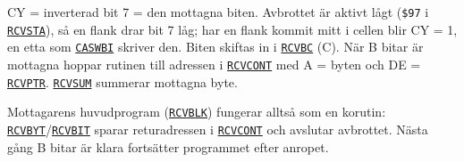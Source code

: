 \begin{Listing}
\begin{Note}
\par\noindent CY = inverterad bit 7 = den mottagna biten. Avbrottet är aktivt lågt (\texttt{\$97} i \hyperlink{l:RCVSTA}{\texttt{RCVSTA}}), så en flank drar bit 7 låg; har en flank kommit mitt i cellen blir CY = 1, en etta som \hyperlink{l:CASWBI}{\texttt{CASWBI}} skriver den. Biten skiftas in i \hyperlink{v:RCVBC}{\texttt{RCVBC}} (C). När B bitar är mottagna hoppar rutinen till adressen i \hyperlink{v:RCVCONT}{\texttt{RCVCONT}} med A = byten och DE = \hyperlink{v:RCVPTR}{\texttt{RCVPTR}}. \hyperlink{v:RCVSUM}{\texttt{RCVSUM}} summerar mottagna byte.\par
\par\noindent Mottagarens huvudprogram (\hyperlink{l:RCVBLK}{\texttt{RCVBLK}}) fungerar alltså som en korutin: \hyperlink{l:RCVBYT}{\texttt{RCVBYT}}/\hyperlink{l:RCVBIT}{\texttt{RCVBIT}} sparar returadressen i \hyperlink{v:RCVCONT}{\texttt{RCVCONT}} och avslutar avbrottet. Nästa gång B bitar är klara fortsätter programmet efter anropet.\par\end{Note}

\end{Listing}
